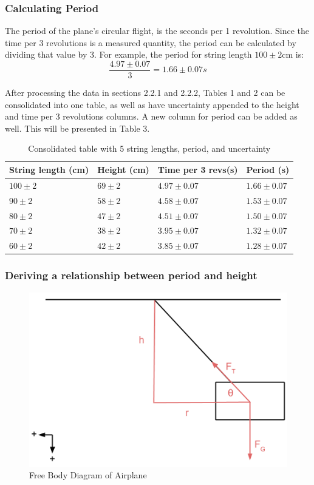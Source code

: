\documentclass[10pt, letterpaper]{article}
\begin{document}
\subsubsection{Calculating Period}
The period of the plane's circular flight, is the seconds per 1 revolution. Since the time per 3 revolutions is a measured quantity,
the period can be calculated by dividing that value by 3. For example, the period for string length $100 \pm 2$cm is:
\[ \frac{4.97 \pm 0.07}{3} = 1.66 \pm 0.07s \]

After processing the data in sections 2.2.1 and 2.2.2, Tables 1 and 2 can be consolidated into one table, as well as have
uncertainty appended to the height and time per 3 revolutions columns. A new column for period can be added as well. This will be presented in Table 3.

\begin{table}[H]
\begin{tabularx}{\linewidth}{>{\centering\arraybackslash}X>{\centering\arraybackslash}X>{\centering\arraybackslash}X>{\centering\arraybackslash}X }
\hline \textbf{String length (cm)} & \textbf{Height (cm)} & \textbf{Time per 3 revs(s)} & \textbf{Period (s)} \\ \hline
$100 \pm 2$ & $69 \pm 2$ & $4.97 \pm 0.07$ & $1.66 \pm 0.07$ \\ \hline
$90 \pm 2$ & $58 \pm 2$ & $4.58 \pm 0.07$ & $1.53 \pm 0.07$ \\ \hline
$80 \pm 2$ & $47 \pm 2$ & $4.51 \pm 0.07$ & $1.50 \pm 0.07$ \\ \hline
$70 \pm 2$ & $38 \pm 2$ & $3.95 \pm 0.07$ & $1.32 \pm 0.07$ \\ \hline
$60 \pm 2$ & $42 \pm 2$ & $3.85 \pm 0.07$ & $1.28 \pm 0.07$ \\ \hline
\end{tabularx}
\caption{Consolidated table with 5 string lengths, period, and uncertainty}
\end{table}

\subsubsection{Deriving a relationship between period and height}

\begin{figure}[!htb]
\centering
\includegraphics[scale=0.5]{Lab1_FreeBody.png}
\caption{Free Body Diagram of Airplane}
\end{figure}
\end{document}
